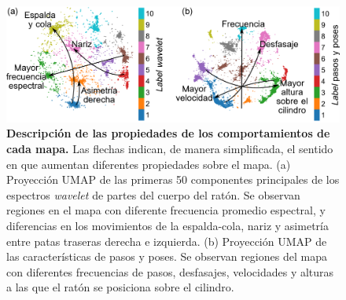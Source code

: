 \begin{figure}[htbp]
    \centering
    \includegraphics[width=0.99\linewidth]{figuras/capitulo4/comentario_label_umap.png}
    \caption{\textbf{Descripción de las propiedades de los comportamientos de cada mapa.}
        Las flechas indican, de manera simplificada, el sentido en que aumentan diferentes propiedades sobre el mapa. (a) Proyección UMAP de las primeras 50 componentes principales de los espectros \textit{wavelet} de partes del cuerpo del ratón. Se observan regiones en el mapa con diferente frecuencia promedio espectral, y diferencias en los movimientos de la espalda-cola, nariz y asimetría entre patas traseras derecha e izquierda. (b) Proyección UMAP de las características de pasos y poses. Se observan regiones del mapa con diferentes frecuencias de pasos, desfasajes, velocidades y alturas a las que el ratón se posiciona sobre el cilindro.}
    \label{fig:capitulo4_comentario_label_umap}
\end{figure}

